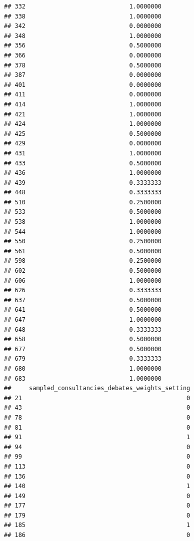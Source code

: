 \documentclass[
]{article}
\begin{document}
\begin{verbatim}
## 332                             1.0000000
## 338                             1.0000000
## 342                             0.0000000
## 348                             1.0000000
## 356                             0.5000000
## 366                             0.0000000
## 378                             0.5000000
## 387                             0.0000000
## 401                             0.0000000
## 411                             0.0000000
## 414                             1.0000000
## 421                             1.0000000
## 424                             1.0000000
## 425                             0.5000000
## 429                             0.0000000
## 431                             1.0000000
## 433                             0.5000000
## 436                             1.0000000
## 439                             0.3333333
## 448                             0.3333333
## 510                             0.2500000
## 533                             0.5000000
## 538                             1.0000000
## 544                             1.0000000
## 550                             0.2500000
## 561                             0.5000000
## 598                             0.2500000
## 602                             0.5000000
## 606                             1.0000000
## 626                             0.3333333
## 637                             0.5000000
## 641                             0.5000000
## 647                             1.0000000
## 648                             0.3333333
## 658                             0.5000000
## 677                             0.5000000
## 679                             0.3333333
## 680                             1.0000000
## 683                             1.0000000
##     sampled_consultancies_debates_weights_setting
## 21                                              0
## 43                                              0
## 78                                              0
## 81                                              0
## 91                                              1
## 94                                              0
## 99                                              0
## 113                                             0
## 136                                             0
## 140                                             1
## 149                                             0
## 177                                             0
## 179                                             0
## 185                                             1
## 186                                             0

\end{verbatim}
\end{document}
